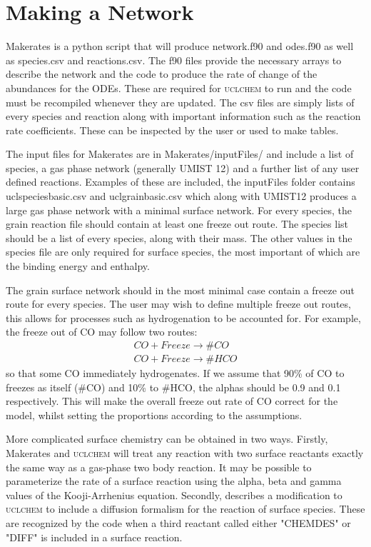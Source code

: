 \documentclass{llncs}
\begin{document}
\section{Making a Network}
\label{sec:network}
Makerates is a python script that will produce network.f90 and odes.f90 as well as species.csv and reactions.csv. The f90 files provide the necessary arrays to describe the network and the code to produce the rate of change of the abundances for the ODEs. These are required for \textsc{uclchem} to run and the code must be recompiled whenever they are updated. The csv files are simply lists of every species and reaction along with important information such as the reaction rate coefficients. These can be inspected by the user or used to make tables. \par
%
The input files for Makerates are in Makerates/inputFiles/ and include a list of species, a gas phase network (generally UMIST 12) and a further list of any user defined reactions. Examples of these are included, the inputFiles folder contains uclspeciesbasic.csv and uclgrainbasic.csv which along with UMIST12 produces a large gas phase network with a minimal surface network. For every species, the grain reaction file should contain at least one freeze out route. The species list should be a list of every species, along with their mass. The other values in the species file are only required for surface species, the most important of which are the binding energy and enthalpy.\par
%
The grain surface network should in the most minimal case contain a freeze out route for every species. The user may wish to define multiple freeze out routes, this allows for processes such as hydrogenation to be accounted for. For example, the freeze out of CO may follow two routes:
\begin{eqnarray}
CO + Freeze \rightarrow \#CO \\
CO + Freeze \rightarrow \#HCO
\end{eqnarray}
 so that some CO immediately hydrogenates. If we assume that 90\% of CO to freezes as itself (\#CO) and 10\% to \#HCO, the alphas should be 0.9 and 0.1 respectively. This will make the overall freeze out rate of CO correct for the model, whilst setting the proportions according to the assumptions.\par
%
More complicated surface chemistry can be obtained in two ways. Firstly, Makerates and \textsc{uclchem} will treat any reaction with two surface reactants exactly the same way as a gas-phase two body reaction. It may be possible to parameterize the rate of a surface reaction using the alpha, beta and gamma values of the Kooji-Arrhenius equation. Secondly, \cite{Quenard2018} describes a modification to \textsc{uclchem} to include a diffusion formalism for the reaction of surface species. These are recognized by the code when a third reactant called either "CHEMDES" or "DIFF" is included in a surface reaction.\par
%
\end{document}
